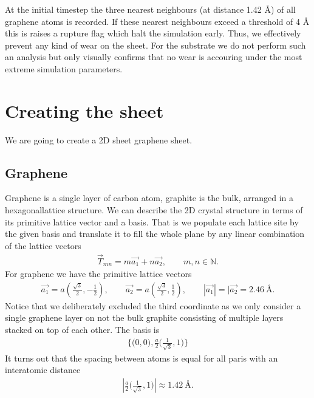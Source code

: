 At the initial timestep the three nearest neighbours (at distance 1.42 Å) of all graphene atoms is recorded. If these nearest neighbours exceed a threshold of 4 Å this is raises a rupture flag which halt the simulation early. Thus, we effectively prevent any kind of wear on the sheet. For the substrate we do not perform such an analysis but only visually confirms that no wear is accouring under the most extreme simulation parameters. 

\section{Creating the sheet}

We are going to create a 2D sheet graphene sheet. 

\subsection{Graphene}

Graphene is a single layer of carbon atom, graphite is the bulk, arranged in a
hexagonallattice structure. We can describe the 2D crystal structure in terms of
its primitive lattice vector and a basis. That is we populate each lattice site
by the given basis and translate it to fill the whole plane by any linear
combination of the lattice vectors
\begin{align*}
  \vec{T}_{mn} = m\vec{a_1} + n\vec{a_2}, \qquad m,n \in \mathbb{N}.
\end{align*}
For graphene we have the primitive lattice vectors 
\begin{align*}
  \vec{a_1} = a \left(\frac{\sqrt{3}}{2}, -\frac{1}{2}\right), \qquad \vec{a_2} = a \left(\frac{\sqrt{3}}{2}, \frac{1}{2}\right), \qquad |\vec{a_1}| = |\vec{a_2} = 2.46 \ \text{Å}.
\end{align*}
Notice that we deliberately excluded the third coordinate as we only consider a
single graphene layer on not the bulk graphite consisting of multiple layers
stacked on top of each other. The basis is 
\begin{align*}
  \Big\{\Big(0,0\Big), \frac{a}{2}\Big(\frac{1}{\sqrt{3}}, 1 \Big) \Big\}
\end{align*}
It turns out that the spacing between atoms is equal for all paris with an
interatomic distance 
\begin{align*}
  \left|\frac{a}{2}\Big(\frac{1}{\sqrt{3}}, 1 \Big)\right| \approx 1.42 \ \text{Å}.
\end{align*}


